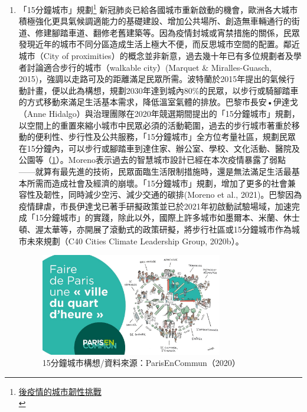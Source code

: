 \documentclass[a4paper,12pt]{article}
\begin{document}
\begin{enumerate}
\item 「15分鐘城市」規劃\footnote{\href{https://rsprc.ntu.edu.tw/zh-tw/m01-3/understand-risk-society/1550-1100222-covid.html}{後疫情的城市韌性挑戰 }\\}
\label{sec:org628fd7b}
新冠肺炎已給各國城市重新啟動的機會，歐洲各大城市積極強化更具氣候調適能力的基礎建設、增加公共場所、創造無車輛通行的街道、修建腳踏車道、翻修老舊建築等。因為疫情封城或宵禁措施的關係，民眾發現近年的城市不同分區造成生活上極大不便，而反思城市空間的配置。鄰近城市（City of proximities）的概念並非新意，過去幾十年已有多位規劃者及學者討論適合步行的城市（walkable city）(Marquet \& Miralles-Guasch, 2015)，強調以走路可及的距離滿足民眾所需。波特蘭於2015年提出的氣候行動計畫，便以此為構想，規劃2030年達到城內80\%的民眾，以步行或騎腳踏車的方式移動來滿足生活基本需求，降低溫室氣體的排放。巴黎市長安•伊達戈（Anne Hidalgo）與治理團隊在2020年競選期間提出的「15分鐘城市」規劃，以空間上的重置來縮小城市中民眾必須的活動範圍，過去的步行城市著重於移動的便利性、步行性及公共服務，「15分鐘城市」全方位考量社區，規劃民眾在15分鐘內，可以步行或腳踏車到達住家、辦公室、學校、文化活動、醫院及公園等（\ref{fig:Paris-1}）。Moreno表示過去的智慧城市設計已經在本次疫情暴露了弱點——就算有最先進的技術，民眾面臨生活限制措施時，還是無法滿足生活最基本所需而造成社會及經濟的崩壞。「15分鐘城市」規劃，增加了更多的社會兼容性及韌性，同時減少空污、減少交通的碳排(Moreno et al., 2021)。巴黎因為疫情肆虐，市長伊達戈已著手研擬政策並已於2021年初啟動試驗場域，加速完成「15分鐘城市」的實踐，除此以外，國際上許多城市如墨爾本、米蘭、休士頓、渥太華等，亦開展了滾動式的政策研擬，將步行社區或15分鐘城市作為城市未來規劃（C40 Cities Climate Leadership Group, 2020b）。\\

\begin{figure}[htbp]
\centering
\includegraphics[width=300]{images/1100222-1.jpg}
\caption{\label{fig:Paris-1}15分鐘城市構想/資料來源：ParisEnCommun（2020）}
\end{figure}
\end{enumerate}
\end{document}
